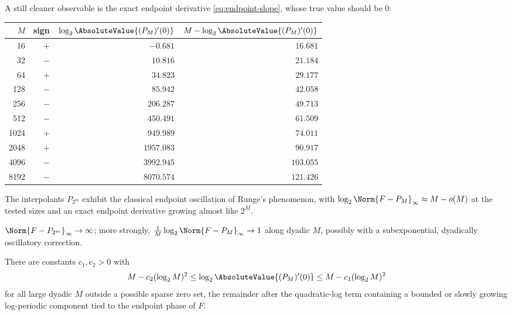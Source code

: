 \documentclass[11pt,oneside]{article}
\numberwithin{equation}{section}
\theoremstyle{definition}
\theoremstyle{remark}
\begin{document}
A still cleaner observable is the exact endpoint derivative
\eqref{eq:endpoint-slope}, whose true value should be $0$:

\begin{center}
\small
\begin{tabular}{rrrr}
\toprule
$M$ & sign & $\log_2\AbsoluteValue{(P_M)'(0)}$ & $M-\log_2\AbsoluteValue{(P_M)'(0)}$ \\
\midrule
16   & $+$ & $-0.681$   & $16.681$ \\
32   & $-$ & $10.816$   & $21.184$ \\
64   & $+$ & $34.823$   & $29.177$ \\
128  & $-$ & $85.942$   & $42.058$ \\
256  & $-$ & $206.287$  & $49.713$ \\
512  & $-$ & $450.491$  & $61.509$ \\
1024 & $+$ & $949.989$  & $74.011$ \\
2048 & $+$ & $1957.083$ & $90.917$ \\
4096 & $-$ & $3992.945$ & $103.055$ \\
8192 & $-$ & $8070.574$ & $121.426$ \\
\bottomrule
\end{tabular}
\label{tab:derivative-defect}
\end{center}

\begin{observation}
The interpolants $P_{2^{m}}$ exhibit the classical endpoint
oscillation of Runge's phenomenon, with
$\log_2\Norm{F-P_M}_\infty\approx M-o(M)$ at the tested sizes and an
exact endpoint derivative growing almost like $2^{M}$.
\end{observation}

\begin{conjecture}
\label{conj:runge-divergence}
$\Norm{F-P_{2^{m}}}_\infty\to\infty$; more strongly,
$\tfrac1M\log_2\Norm{F-P_M}_\infty\to1$ along dyadic $M$, possibly
with a subexponential, dyadically oscillatory correction.
\end{conjecture}

\begin{conjecture}
\label{conj:derivative-law}
There are constants $c_1,c_2>0$ with
\begin{equation}
 M-c_2(\log_2M)^{2}
 \le\log_2\AbsoluteValue{(P_M)'(0)}
 \le M-c_1(\log_2M)^{2}
 \label{eq:derivative-conjecture}
\end{equation}
for all large dyadic $M$ outside a possible sparse zero set, the
remainder after the quadratic-log term containing a bounded or slowly
growing log-periodic component tied to the endpoint phase of $F$.
\end{conjecture}
\end{document}
